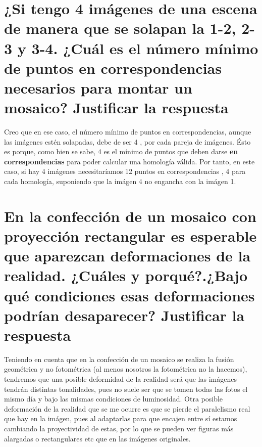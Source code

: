 \section{¿Si tengo 4 imágenes de una escena de manera que se solapan la 1-2, 2-3
y 3-4. ¿Cuál es el número mínimo de puntos en correspondencias necesarios para
montar un mosaico? Justificar la respuesta}
Creo que en ese caso, el número mínimo de puntos en correspondencias, aunque las imágenes estén solapadas, debe de ser
4 , por cada pareja de imágenes. Ésto es porque, como bien se sabe, 4 es el mínimo de puntos que deben darse \textbf{en correspondencias}
para poder calcular una homología válida. Por tanto, en este caso, si hay 4 imágenes necesitaríamos 12 puntos en correspondencias , 4 para
cada homología, suponiendo que la imágen 4 no engancha con la imágen 1.
\section{En la confección de un mosaico con proyección rectangular es esperable
que aparezcan deformaciones de la realidad. ¿Cuáles y porqué?.¿Bajo qué
condiciones esas deformaciones podrían desaparecer? Justificar la respuesta}
Teniendo en cuenta que en la confección de un mosaico se realiza la fusión geométrica y no fotométrica (al menos nosotros
la fotométrica no la hacemos), tendremos que una posible deformidad de la realidad será que las imágenes tendrán distintas tonalidades, pues
no suele ser que se tomen todas las fotos el mismo día y bajo las mismas condiciones de luminosidad. \newline
Otra posible deformación de la realidad que se me ocurre es que se pierde el paralelismo real que hay en la imágen, pues al adaptarlas
para que encajen entre sí estamos cambiando la proyectividad de estas, por lo que se pueden ver figuras más alargadas o rectangulares etc
que en las imágenes originales. 


